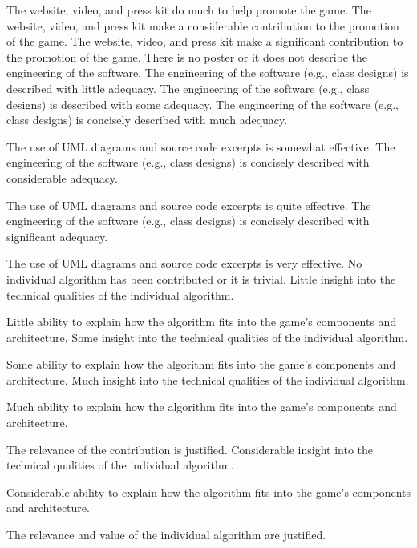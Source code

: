 \documentclass{../../fal_assignment}
\begin{document}
\begin{markingrubric}
        \grade The website, video, and press kit do much to help promote the game.
        \grade The website, video, and press kit make a considerable contribution to the promotion of the game.
        \grade The website, video, and press kit make a significant contribution to the promotion of the game.
%
        \grade\fail There is no poster or it does not describe the engineering of the software. 
        \grade The engineering of the software (e.g., class designs) is described with little adequacy.
        \grade The engineering of the software (e.g., class designs) is described with some adequacy.
        \grade The engineering of the software (e.g., class designs) is concisely described with much adequacy.
            \par The use of UML diagrams and source code excerpts is somewhat effective.
        \grade The engineering of the software (e.g., class designs) is concisely described with considerable adequacy.
            \par The use of UML diagrams and source code excerpts is quite effective.
        \grade The engineering of the software (e.g., class designs) is concisely described with significant adequacy.
            \par The use of UML diagrams and source code excerpts is very effective.
%
        \grade\fail No individual algorithm has been contributed or it is trivial.
        \grade Little insight into the technical qualities of the individual algorithm.
            \par Little ability to explain how the algorithm fits into the game's components and architecture.
        \grade Some insight into the technical qualities of the individual algorithm.
            \par Some ability to explain how the algorithm fits into the game's components and architecture.
        \grade Much insight into the technical qualities of the individual algorithm.
            \par Much ability to explain how the algorithm fits into the game's components and architecture.
            \par The relevance of the contribution is justified.
        \grade Considerable insight into the technical qualities of the individual algorithm.
            \par Considerable ability to explain how the algorithm fits into the game's components and architecture.
            \par The relevance and value of the individual algorithm are justified.

\end{markingrubric}
\end{document}
